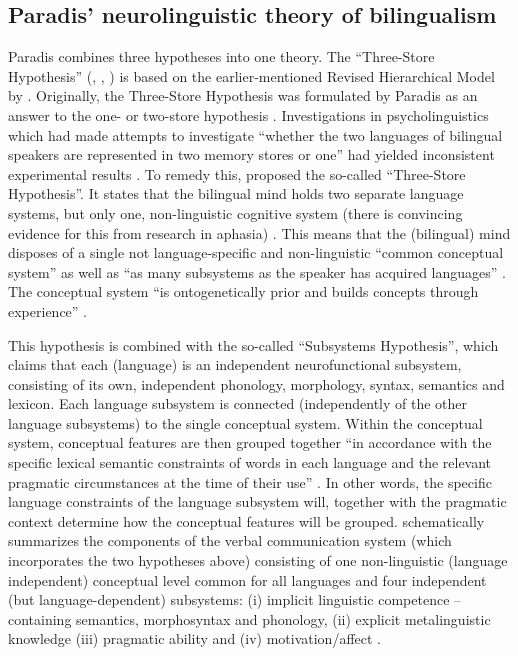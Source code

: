 \subsection{Paradis’ neurolinguistic theory of bilingualism}
\label{sec:5.3.1}  
Paradis combines three hypotheses into one theory. The “Three-Store Hypothesis” (\citeyear{paradis_bilingual_1978; paradis_language_1980}, \citeyear[195--203]{paradis_neurolinguistic_2004}, \citeyear[3--28]{kecskes_neurofunctional_2007}) is based on the earlier-mentioned Revised Hierarchical Model by \citet{kroll_category_1994}. Originally, the Three-Store Hypothesis was formulated by Paradis as an answer to the one- or two-store hypothesis \citep{kolers_bilingualism_1968,hornby_bilingual_1977}. Investigations in psycholinguistics which had made attempts to investigate “whether the two languages of bilingual speakers are represented in two memory stores or one” had yielded inconsistent experimental results \citep[6]{kecskes_neurofunctional_2007}. To remedy this, \citet{paradis_bilingual_1978, paradis_language_1980} proposed the so-called “Three-Store Hypothesis”. It states that the bilingual mind holds two separate language systems, but only one, non-linguistic cognitive system (there is convincing evidence for this from research in aphasia) \citep[196]{paradis_neurolinguistic_2004}. This means that the (bilingual) mind disposes of a single not language-specific and non-linguistic “common conceptual system” as well as “as many subsystems as the speaker has acquired languages” \citep[3]{kecskes_neurofunctional_2007}. The conceptual system “is ontogenetically prior and builds concepts through experience” \citep[198]{paradis_neurolinguistic_2004}.

This hypothesis is combined with the so-called “Subsystems Hypothesis”, which claims that each (language) is an independent neurofunctional subsystem, consisting of its own, independent phonology, morphology, syntax, semantics and lexicon. Each language subsystem is connected (independently of the other language subsystems) to the single conceptual system. Within the conceptual system, conceptual features are then grouped together “in accordance with the specific lexical semantic constraints of words in each language and the relevant pragmatic circumstances at the time of their use” \citep[3]{kecskes_neurofunctional_2007}. In other words, the specific language constraints of the language subsystem will, together with the pragmatic context determine how the conceptual features will be grouped.  schematically summarizes the components of the verbal communication system (which incorporates the two hypotheses above) consisting of one non-linguistic (language independent) conceptual level common for all languages and four independent (but language-dependent) subsystems: (i) implicit linguistic competence – containing semantics, morphosyntax and phonology, (ii) explicit metalinguistic knowledge (iii) pragmatic ability and (iv) motivation/affect \citep[3]{paradis_neurolinguistic_2004, kecskes_neurofunctional_2007}.


